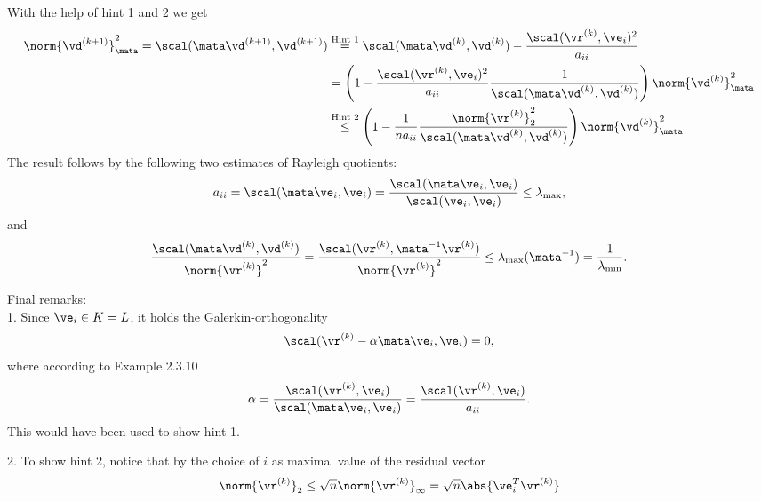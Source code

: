 \begin{SolutionSheet}[\ref{sheet8}]
\begin{onehalfspace}
\begin{Solution}
    With the help of hint 1 and 2 we get
    \begin{align*}
      \norm{\vd^{(k+1)}}_{\mata}^2
      = \scal(\mata\vd^{(k+1)},\vd^{(k+1)})
      &\stackrel{\text{Hint 1}}{=}
        \scal(\mata\vd^{(k)},\vd^{(k)})
        - \frac{\scal(\vr^{(k)},\ve_i)^2}{a_{ii}}
      \\
      &=
        \left( 1 - \frac{\scal(\vr^{(k)},\ve_i)^2}{a_{ii}}
              \frac1{\scal(\mata\vd^{(k)},\vd^{(k)})} \right)
        \norm{\vd^{(k)}}_{\mata}^2
      \\
      &\stackrel{\text{Hint 2}}{\leq}
        \left( 1 - \frac{1}{n a_{ii}}
              \frac{\norm{\vr^{(k)}}_2^2}{\scal(\mata\vd^{(k)},\vd^{(k)})} \right)
        \norm{\vd^{(k)}}_{\mata}^2
    \end{align*}
    The result follows by the following two estimates of Rayleigh quotients:
    \begin{gather*}
      a_{ii} = \scal(\mata\ve_i,\ve_i) = \frac{\scal(\mata\ve_i,\ve_i)}{\scal(\ve_i,\ve_i)}
      \le \lambda_{\max},
    \end{gather*}
    and
    \begin{gather*}
      \frac{\scal(\mata\vd^{(k)},\vd^{(k)})}{\norm{\vr^{(k)}}^2}
      = \frac{\scal(\vr^{(k)},\mata^{-1}\vr^{(k)})}{\norm{\vr^{(k)}}^2}
      \le \lambda_{\max}(\mata^{-1})
      = \frac1{\lambda_{\min}}.
    \end{gather*}

    Final remarks:\\
    1. Since $\ve_i\in K=L$, it holds the Galerkin-orthogonality
    \begin{align*}
      \scal(\vr^{(k)}-\alpha\mata \ve_i,\ve_i) = 0,
    \end{align*}
    where according to Example 2.3.10
    \begin{gather*}
      \alpha = \frac{\scal(\vr^{(k)},\ve_i)}{\scal(\mata\ve_i,\ve_i)}
      = \frac{\scal(\vr^{(k)},\ve_i)}{a_{ii}}
      .
    \end{gather*}
    This would have been used to show hint 1.

    2. To show hint 2, notice that by the choice of $i$ as maximal
    value of the residual vector
    \begin{align*}
      \norm{\vr^{(k)}}_2
      \leq \sqrt{n} \norm{\vr^{(k)}}_{\infty}
      = \sqrt{n} \abs{\ve_i^T\vr^{(k)}}
    \end{align*}

  \end{Solution}


\end{onehalfspace}
\end{SolutionSheet}
